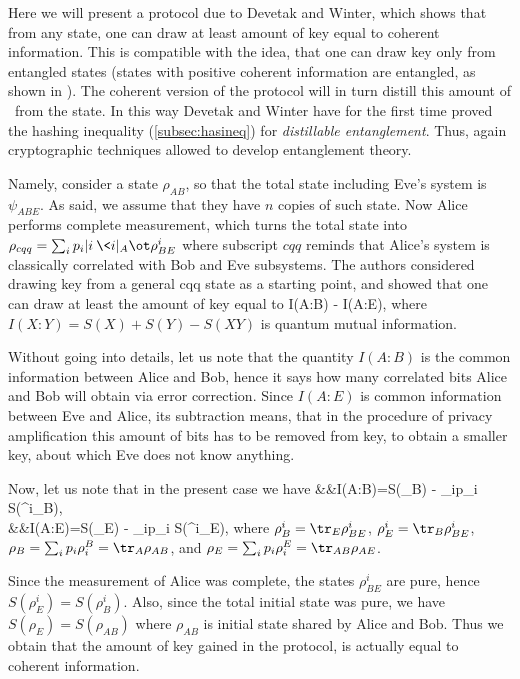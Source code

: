 \documentclass[rmp,12pt,preprint]{revtex4-2}
\begin{document}
Here we will present a protocol due to Devetak and Winter, which shows
that from any state, one can draw at least amount of key equal to
coherent information.  This is compatible with the idea, that one can
draw key only from entangled states (states with positive coherent
information are entangled, as shown in \cite{RPH1994}). The coherent
version of the protocol will in turn distill this amount of \singlets\
from the state. In this way Devetak and Winter have for the first time
proved the hashing inequality (\ref{subsec:hasineq}) for {\it
  distillable entanglement}. Thus, again cryptographic techniques
allowed to develop entanglement theory.

Namely, consider a state $\rho_{AB}$, so that the total state
including Eve's system is $\psi_{ABE}$. As said, we assume that they
have $n$ copies of such state. Now Alice performs complete
measurement, which turns the total state into $\rho_{cqq} = \sum_{i}
p_i |i\>\<i|_A\ot \rho^{i}_{BE}$ where subscript $cqq$ reminds that
Alice's system is classically correlated with Bob and Eve
subsystems. The authors considered drawing key from a general cqq
state as a starting point, and showed that one can draw at least the
amount of key equal to
\be
I(A:B) - I(A:E),
\label{eq:Qckbound}
\ee
where $I(X:Y)=S(X)+S(Y)-S(XY)$ is quantum mutual information.

Without going into details, let us note that
the quantity $I(A:B)$ is the common information between
Alice and Bob, hence it says how many correlated bits Alice and Bob
will obtain via error correction. Since $I(A:E)$ is common information
between Eve and Alice, its subtraction means, that in the procedure of
privacy amplification this amount of bits has to be removed from key,
to obtain a smaller key, about which Eve does not know anything.

Now, let us note that in the present case we have
\ben
&&I(A:B)=S(\rho_B) - \sum_ip_i S(\rho^i_B), \nonumber\\
&&I(A:E)=S(\rho_E) - \sum_ip_i S(\rho^i_E),
\een
where $\rho_B^i=\tr_E\rho^i_{BE}$, $\rho_E^i=\tr_B\rho^i_{BE}$,
$\rho_B=\sum_i p_i \rho_i^B=\tr_A\rho_{AB}$, and
$\rho_E=\sum_i p_i \rho_i^E=\tr_{AB}\rho_{AE}$.

Since the measurement of Alice was complete, the states
$\rho_{BE}^i$ are pure, hence $S(\rho^i_E)=S(\rho^i_B)$. Also, since
the total initial state was pure, we have $S(\rho_E)=S(\rho_{AB})$
where $\rho_{AB}$ is initial state shared by Alice and Bob. Thus we
obtain that the amount of key gained in the protocol, is actually
equal to coherent information.
\end{document}
